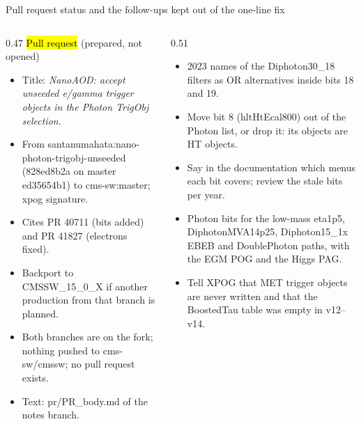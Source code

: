 \begin{frame}{Pull request status and the follow-ups kept out of the one-line fix}
  \begin{columns}[T]
    \begin{column}{0.47\linewidth}
      \hl{Pull request} (prepared, not opened)
      \begin{itemize}\scriptsize
        \item Title: \emph{NanoAOD: accept unseeded e/gamma trigger objects in the Photon TrigObj selection}.
        \item From santanumahata:nano-photon-trigobj-unseeded (828ed8b2a on master ed35654b1) to cms-sw:master;
              xpog signature.
        \item Cites PR 40711 (bits added) and PR 41827 (electrons fixed).
        \item Backport to CMSSW\_15\_0\_X if another production from that branch is planned.
        \item Both branches are on the fork; nothing pushed to cms-sw/cmssw; no pull request exists.
        \item Text: pr/PR\_body.md of the notes branch.
      \end{itemize}
    \end{column}
    \begin{column}{0.51\linewidth}
      \begin{itemize}\scriptsize
        \item 2023 names of the Diphoton30\_18 filters as OR alternatives inside bits 18 and 19.
        \item Move bit 8 (hltHtEcal800) out of the Photon list, or drop it: its objects are HT objects.
        \item Say in the documentation which menus each bit covers; review the stale bits per year.
        \item Photon bits for the low-mass eta1p5, DiphotonMVA14p25, Diphoton15\_1x EBEB and DoublePhoton paths,
              with the EGM POG and the Higgs PAG.
        \item Tell XPOG that MET trigger objects are never written and that the BoostedTau table was empty in v12--v14.
      \end{itemize}
    \end{column}
  \end{columns}
\end{frame}

